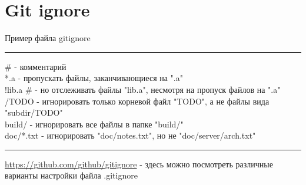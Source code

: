 \documentclass[a4paper, 12px]{report}
\begin{document}
\section{Git ignore}

Пример файла gitignore\\
\noindent\rule{\textwidth}{1pt}
\# - комментарий\\
*.a - пропускать файлы, заканчивающиеся на ".a"\\
!lib.a \# - но отслеживать файлы "lib.a", несмотря на пропуск файлов на ".a"\\
/TODO - игнорировать только корневой файл "TODO", а не файлы вида "subdir/TODO"\\
build/ - игнорировать все файлы в папке "build/"\\
doc/*.txt - игнорировать "doc/notes.txt", но не "doc/server/arch.txt"\\
\noindent\rule{\textwidth}{1pt}
\href{https://github.com/github/gitignore}{https://github.com/github/gitignore} - здесь можно посмотреть различные варианты настройки файла .gitignore
\end{document}
